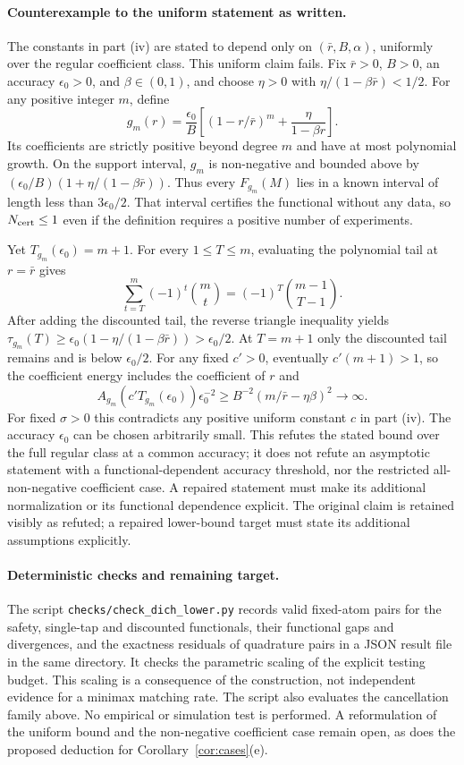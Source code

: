 \documentclass[11pt]{article}
\theoremstyle{definition}
\theoremstyle{remark}
\begin{document}
\paragraph{Counterexample to the uniform statement as written.}
The constants in part (iv) are stated to depend only on $(\bar r,B,\alpha)$, uniformly over the regular coefficient class. This uniform claim fails. Fix $\bar r>0$, $B>0$, an accuracy $\epsilon_0>0$, and $\beta\in(0,1)$, and choose $\eta>0$ with $\eta/(1-\beta\bar r)<1/2$. For any positive integer $m$, define
\[
g_m(r)=\frac{\epsilon_0}{B}\left[(1-r/\bar r)^m+\frac{\eta}{1-\beta r}\right].
\]
Its coefficients are strictly positive beyond degree $m$ and have at most polynomial growth. On the support interval, $g_m$ is non-negative and bounded above by $(\epsilon_0/B)(1+\eta/(1-\beta\bar r))$. Thus every $F_{g_m}(M)$ lies in a known interval of length less than $3\epsilon_0/2$. That interval certifies the functional without any data, so $N_{\rm cert}\le1$ even if the definition requires a positive number of experiments.

Yet $T_{g_m}(\epsilon_0)=m+1$. For every $1\le T\le m$, evaluating the polynomial tail at $r=\bar r$ gives
\[
\sum_{t=T}^m(-1)^t\binom mt=(-1)^T\binom{m-1}{T-1}.
\]
After adding the discounted tail, the reverse triangle inequality yields $\tau_{g_m}(T)\ge\epsilon_0(1-\eta/(1-\beta\bar r))>\epsilon_0/2$. At $T=m+1$ only the discounted tail remains and is below $\epsilon_0/2$. For any fixed $c'>0$, eventually $c'(m+1)>1$, so the coefficient energy includes the coefficient of $r$ and
\[
A_{g_m}(c'T_{g_m}(\epsilon_0))\epsilon_0^{-2}
\ge B^{-2}(m/\bar r-\eta\beta)^2\longrightarrow\infty.
\]
For fixed $\sigma>0$ this contradicts any positive uniform constant $c$ in part (iv). The accuracy $\epsilon_0$ can be chosen arbitrarily small. This refutes the stated bound over the full regular class at a common accuracy; it does not refute an asymptotic statement with a functional-dependent accuracy threshold, nor the restricted all-non-negative coefficient case. A repaired statement must make its additional normalization or its functional dependence explicit. The original claim is retained visibly as refuted; a repaired lower-bound target must state its additional assumptions explicitly.

\paragraph{Deterministic checks and remaining target.}
The script \texttt{checks/check\_dich\_lower.py} records valid fixed-atom pairs for the safety, single-tap and discounted functionals, their functional gaps and divergences, and the exactness residuals of quadrature pairs in a JSON result file in the same directory. It checks the parametric scaling of the explicit testing budget. This scaling is a consequence of the construction, not independent evidence for a minimax matching rate. The script also evaluates the cancellation family above. No empirical or simulation test is performed. A reformulation of the uniform bound and the non-negative coefficient case remain open, as does the proposed deduction for Corollary~\ref{cor:cases}(e).
\end{document}
